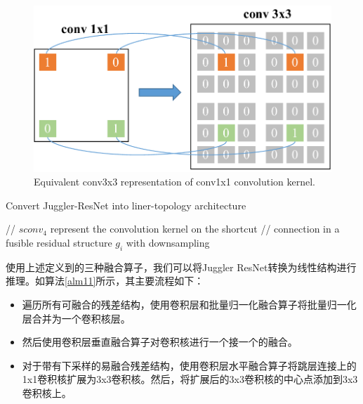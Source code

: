 \begin{figure}[h]
	\centering
	\includegraphics[width=1\textwidth]{figures/Jresnet/FIG6_TII-21-2603.pdf}
	\caption{Equivalent conv3x3 representation of conv1x1 convolution kernel.}
	\label{conv1_expand}
\end{figure}


\begin{algorithm}[H]
	\caption{Convert Juggler-ResNet into liner-topology architecture}
	
	\BlankLine
	// $sconv_{4}$ represent the convolution kernel on the shortcut\; 
	// connection in a fusible residual structure $ g_{i}$ with downsampling\;
	\label{alm11}
\end{algorithm}

使用上述定义到的三种融合算子，我们可以将Juggler ResNet转换为线性结构进行推理。如算法\ref{alm11}所示，其主要流程如下：
\begin{itemize}
	\item 遍历所有可融合的残差结构，使用卷积层和批量归一化融合算子将批量归一化层合并为一个卷积核层。 
	\item 然后使用卷积层垂直融合算子对卷积核进行一个接一个的融合。
	\item 对于带有下采样的易融合残差结构，使用卷积层水平融合算子将跳层连接上的1x1卷积核扩展为3x3卷积核。然后，将扩展后的3x3卷积核的中心点添加到3x3卷积核上。
\end{itemize}


